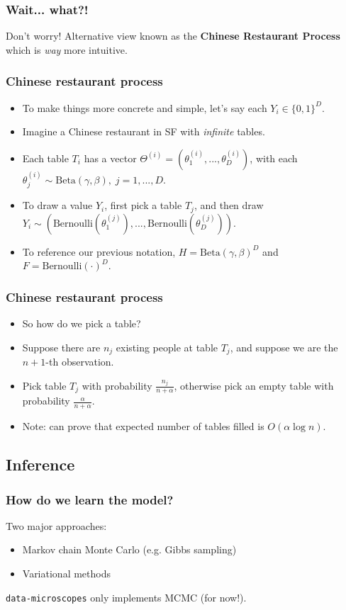 \documentclass{beamer}
\begin{document}
\begin{frame}
\frametitle{Wait... what?!}
\pause
Don't worry!  Alternative view known as the \textbf{Chinese Restaurant Process}
which is \emph{way} more intuitive.
\end{frame}


\begin{frame}
\frametitle{Chinese restaurant process}
\begin{itemize}[<+->]
  \item To make things more concrete and simple, let's say each $Y_i \in \{0,1\}^{D}$.
  \item Imagine a Chinese restaurant in SF with \emph{infinite} tables.
  \item Each table $T_i$ has a vector $\Theta^{(i)} = (\theta^{(i)}_1, ..., \theta^{(i)}_D)$, with
    each $\theta^{(i)}_j \sim \text{Beta}(\gamma, \beta),\; j{=}1,...,D$.
  \item To draw a value $Y_i$, first pick a table $T_j$, and then draw $Y_i \sim (\text{Bernoulli}(\theta^{(j)}_1), ..., \text{Bernoulli}(\theta^{(j)}_D))$.
  \item To reference our previous notation, $H=\text{Beta}(\gamma,\beta)^{D}$ and $F=\text{Bernoulli}(\cdot)^{D}$.
\end{itemize}
\end{frame}

\begin{frame}
\frametitle{Chinese restaurant process}
\begin{itemize}[<+->]
  \item So how do we pick a table?
  \item Suppose there are $n_j$ existing people at table $T_j$, and suppose we are the $n+1$-th observation.
  \item Pick table $T_j$ with probability $\frac{n_j}{n + \alpha}$, otherwise pick an empty table with probability $\frac{\alpha}{n + \alpha}$.
  \item Note: can prove that expected number of tables filled is $O(\alpha \log{n})$.
\end{itemize}
\end{frame}

\subsection{Inference}

\begin{frame}
\frametitle{How do we learn the model?}
\pause
Two major approaches:
\pause
\begin{itemize}[<+->]
  \item Markov chain Monte Carlo (e.g. Gibbs sampling)
  \item Variational methods 
\end{itemize}
\pause
\texttt{data-microscopes} only implements MCMC (for now!). 
\end{frame}
\end{document}
